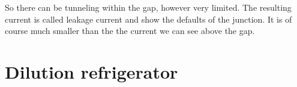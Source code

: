         So there can be tunneling within the gap, however very limited. The resulting current is called leakage current and show the defaults of the junction. It is of course much smaller than the the current we can see above the gap. 
        
        \section{Dilution refrigerator}
        
        
        
